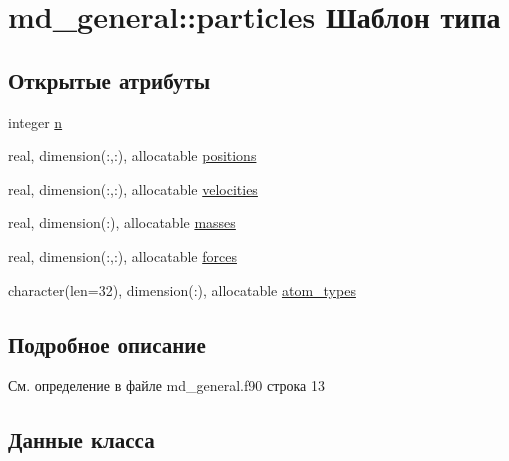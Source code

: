 \hypertarget{structmd__general_1_1particles}{}\section{md\+\_\+general\+:\+:particles Шаблон типа}
\label{structmd__general_1_1particles}
\subsection*{Открытые атрибуты}
\begin{DoxyCompactItemize}
\item 
integer \mbox{\hyperlink{structmd__general_1_1particles_aeace4d645aa37734b6204936be3d528e}{n}}
\item 
real, dimension(\+:,\+:), allocatable \mbox{\hyperlink{structmd__general_1_1particles_a39f160de26e2d4fd6998e57f46fad846}{positions}}
\item 
real, dimension(\+:,\+:), allocatable \mbox{\hyperlink{structmd__general_1_1particles_af4164f454743cd600f1f96b5f8bd57a7}{velocities}}
\item 
real, dimension(\+:), allocatable \mbox{\hyperlink{structmd__general_1_1particles_a3f42e69b5affa491731cdd18733b443a}{masses}}
\item 
real, dimension(\+:,\+:), allocatable \mbox{\hyperlink{structmd__general_1_1particles_a87bc129db48217c4312de873a2215616}{forces}}
\item 
character(len=32), dimension(\+:), allocatable \mbox{\hyperlink{structmd__general_1_1particles_a566eeeb59bf158139e232701253e7cab}{atom\+\_\+types}}
\end{DoxyCompactItemize}


\subsection{Подробное описание}


См. определение в файле md\+\_\+general.\+f90 строка 13



\subsection{Данные класса}
\mbox{\label{structmd__general_1_1particles_a566eeeb59bf158139e232701253e7cab}} 
